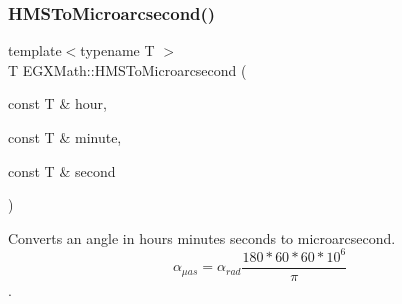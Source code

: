 \mbox{\label{group___e_g_x_math-_angle_conversions-_h_m_s_ga5d91ade4a1aaf641f9483e840e701446}} 
\subsubsection{\texorpdfstring{H\+M\+S\+To\+Microarcsecond()}{HMSToMicroarcsecond()}}
{\footnotesize\ttfamily template$<$typename T $>$ \\
T E\+G\+X\+Math\+::\+H\+M\+S\+To\+Microarcsecond (\begin{DoxyParamCaption}\item[{const T \&}]{hour,  }\item[{const T \&}]{minute,  }\item[{const T \&}]{second }\end{DoxyParamCaption})}



Converts an angle in hours minutes seconds to microarcsecond. \[\alpha_{\mu as}=\alpha_{rad}\frac{180 * 60 * 60 * 10^6}{\pi}\]. 

